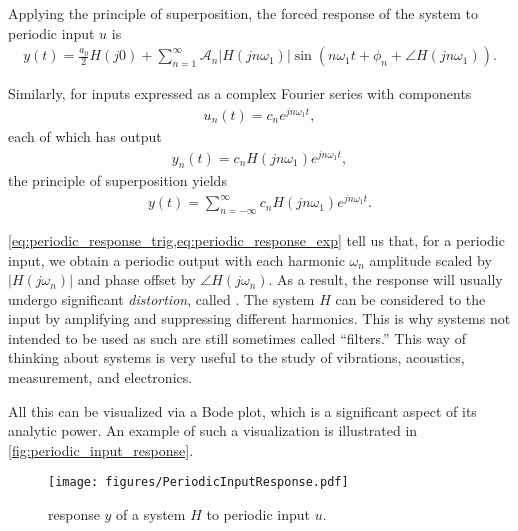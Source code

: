 \documentclass[dynamic_systems.tex]{subfiles}
\begin{document}
Applying the principle of superposition, the forced response of the system to periodic input $u$ is
\begin{align} \label{eq:periodic_response_trig}
	y(t) = \frac{a_0}{2} H(j 0) + 
		\sum_{n=1}^\infty \mathcal{A}_n |H(j n \omega_1)| \sin(n\omega_1 t + \phi_n + \angle H(j n \omega_1)).
\end{align}

Similarly, for inputs expressed as a complex Fourier series with components
\begin{align}
	u_n(t) = c_n e^{j n \omega_1 t},
\end{align}
each of which has output
\begin{align}
	y_n(t) = c_n H(j n \omega_1) e^{j n \omega_1 t},
\end{align}
the principle of superposition yields
\begin{align}\label{eq:periodic_response_exp}
	y(t) = 
		\sum_{n=-\infty}^\infty c_n H(j n \omega_1) e^{j n \omega_1 t}.
\end{align}

\cref{eq:periodic_response_trig,eq:periodic_response_exp} tell us that, for a periodic input, we obtain a periodic output with each harmonic $\omega_n$ amplitude scaled by $|H(j\omega_n)|$ and phase offset by $\angle H(j\omega_n)$.
As a result, the response will usually undergo significant \emph{distortion}, called .
The system $H$ can be considered to  the input by amplifying and suppressing different harmonics.
This is why systems not intended to be used as such are still sometimes called ``filters.''
This way of thinking about systems is very useful to the study of vibrations, acoustics, measurement, and electronics.
\tags{}

All this can be visualized via a Bode plot, which is a significant aspect of its analytic power.
An example of such a visualization is illustrated in \autoref{fig:periodic_input_response}.
\tags{}

\begin{figure}
\centering
\texttt{[image: figures/PeriodicInputResponse.pdf]}
\caption{response $y$ of a system $H$ to periodic input $u$.}
\label{fig:periodic_input_response}
\end{figure}

\end{document}
